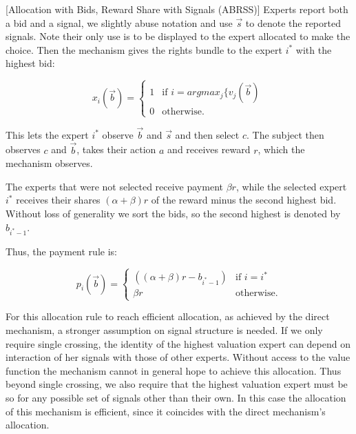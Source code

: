 \begin{mech}\label{mech:Direct}[Allocation with Bids, Reward Share with Signals (ABRSS)]
	Experts report both a bid and a signal, we slightly abuse notation and use $\vec s$ to denote the reported signals. Note their only use is to be displayed to the expert allocated to make the choice.
	Then the mechanism gives the rights bundle to the expert $i^*$ with the highest bid:
	
   $$x_i(\vec{b}) = \begin{cases} 1 & \text{if }  i = argmax_j \{v_j(\vec b)\ \\ 0 & \text{otherwise.} \end{cases}$$
	
      This lets the expert $i^*$ observe  $\vec{b}$ and $\vec s$ and then select $c$. The subject then observes $c$ and $\vec{b}$, takes their action $a$ and receives reward $r$, which the mechanism observes. 

	The experts that were not selected receive  payment $\beta r$, while the selected expert $i^*$ receives their shares $(\alpha + \beta) r$ of the reward minus the second highest bid. Without loss of generality we sort the bids, so the second highest is denoted by $b_{i^*-1}$.

	Thus, the payment rule is:
	
   $$p_i(\vec b)= \begin{cases} ((\alpha + \beta)r - b_{i^*-1})& \text{if }i = i^* \\ \beta r & \text{otherwise.} \end{cases}$$
\end{mech}



For this allocation rule to reach efficient allocation, as achieved by the direct mechanism, a stronger assumption on signal structure is needed. If we only require single crossing, the identity of the highest valuation expert can depend on interaction of her signals with those of other experts. Without access to the value function the mechanism cannot in general hope to achieve this allocation.
Thus beyond single crossing, we also require that the highest valuation expert must be so for any possible set of signals other than their own. In this case the allocation of this mechanism is efficient, since it coincides with the direct mechanism's allocation.

